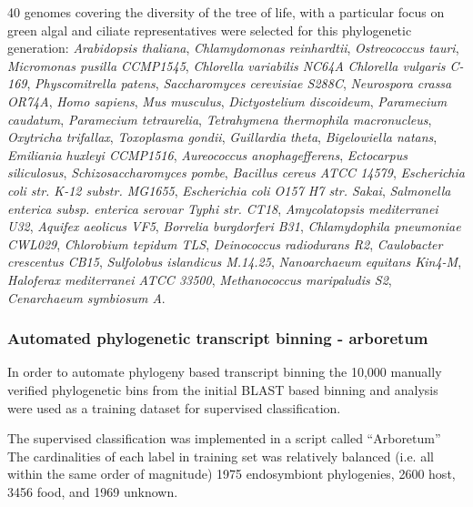 40 genomes covering the diversity of the tree of life, with a particular focus on green algal and ciliate representatives 
were selected for this phylogenetic generation: 
\textit{Arabidopsis thaliana}, \textit{Chlamydomonas reinhardtii},
\textit{Ostreococcus tauri}, \textit{Micromonas pusilla CCMP1545},  \textit{Chlorella variabilis NC64A}
\textit{Chlorella vulgaris C-169}, \textit{Physcomitrella patens}, \textit{Saccharomyces cerevisiae S288C}, 
\textit{Neurospora crassa OR74A},
\textit{Homo sapiens},
\textit{Mus musculus},
\textit{Dictyostelium discoideum},
\textit{Paramecium caudatum},
\textit{Paramecium tetraurelia},
\textit{Tetrahymena thermophila macronucleus},
\textit{Oxytricha trifallax},
\textit{Toxoplasma gondii},
\textit{Guillardia theta},
\textit{Bigelowiella natans},
\textit{Emiliania huxleyi CCMP1516},
\textit{Aureococcus anophagefferens},
\textit{Ectocarpus siliculosus},
\textit{Schizosaccharomyces pombe},
\textit{Bacillus cereus ATCC 14579},
\textit{Escherichia coli str. K-12 substr. MG1655},
\textit{Escherichia coli O157 H7 str. Sakai},
\textit{Salmonella enterica subsp. enterica serovar Typhi str. CT18},
\textit{Amycolatopsis mediterranei U32},
\textit{Aquifex aeolicus VF5},
\textit{Borrelia burgdorferi B31},
\textit{Chlamydophila pneumoniae CWL029},
\textit{Chlorobium tepidum TLS},
\textit{Deinococcus radiodurans R2},
\textit{Caulobacter crescentus CB15},
\textit{Sulfolobus islandicus M.14.25},
\textit{Nanoarchaeum equitans Kin4-M},
\textit{Haloferax mediterranei ATCC 33500},
\textit{Methanococcus maripaludis S2},
\textit{Cenarchaeum symbiosum A}.

\subsubsection{Automated phylogenetic transcript binning - arboretum}
In order to automate phylogeny based transcript binning the 10,000
manually verified phylogenetic bins from the initial BLAST based binning
and analysis were used as a training dataset for supervised classification.

The supervised classification was implemented in a script called ``Arboretum''
The cardinalities of each label in training set was relatively balanced (i.e. all within
the same order of magnitude) 1975 endosymbiont phylogenies, 2600 host, 3456 food, and 1969
unknown. 

